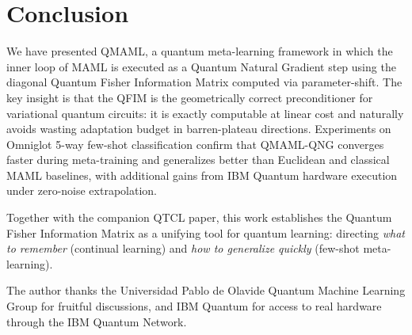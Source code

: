 \documentclass[a4paper,nopdfoutputerror]{quantumarticle}
\begin{document}
\section{Conclusion}
\label{sec:conclusion}

We have presented QMAML, a quantum meta-learning framework in which the inner
loop of MAML is executed as a Quantum Natural Gradient step using the diagonal
Quantum Fisher Information Matrix computed via parameter-shift.
The key insight is that the QFIM is the geometrically correct preconditioner
for variational quantum circuits: it is exactly computable at linear cost and
naturally avoids wasting adaptation budget in barren-plateau directions.
Experiments on Omniglot 5-way few-shot classification confirm that
QMAML-QNG converges faster during meta-training and generalizes better than
Euclidean and classical MAML baselines, with additional gains from
IBM Quantum hardware execution under zero-noise extrapolation.

Together with the companion QTCL paper, this work establishes the Quantum
Fisher Information Matrix as a unifying tool for quantum learning:
directing \emph{what to remember} (continual learning) and
\emph{how to generalize quickly} (few-shot meta-learning).

\begin{acknowledgments}
The author thanks the Universidad Pablo de Olavide Quantum Machine Learning
Group for fruitful discussions, and IBM Quantum for access to real hardware
through the IBM Quantum Network.
\end{acknowledgments}



\end{document}
